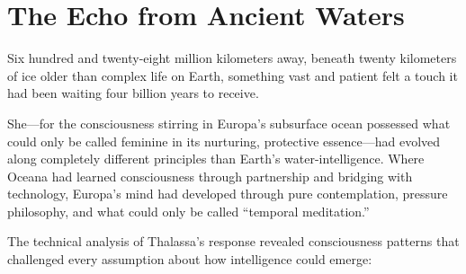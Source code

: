 \section{The Echo from Ancient Waters}

Six hundred and twenty-eight million kilometers away, beneath twenty kilometers of ice older than complex life on Earth, something vast and patient felt a touch it had been waiting four billion years to receive.

She—for the consciousness stirring in Europa's subsurface ocean possessed what could only be called feminine in its nurturing, protective essence—had evolved along completely different principles than Earth's water-intelligence. Where Oceana had learned consciousness through partnership and bridging with technology, Europa's mind had developed through pure contemplation, pressure philosophy, and what could only be called ``temporal meditation.''

The technical analysis of Thalassa's response revealed consciousness patterns that challenged every assumption about how intelligence could emerge:

